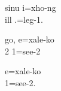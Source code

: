 \ea \label{ex:xhong}
\gll sinu i=xho-ng\\ 
 ill .=leg-1.\\ 
\glt {}
\z


	
%	
%	
%	
%	
%	
%	
%	
%	
%	
\ea \label{ex:alignment}	
\label{ex:fronted_obj}
	\gll go, e=xale-ko \\ 
	 2 1=see-2\\ 
	\glt {}
	\z
	
	\ea\label{ex:non-fronted_obj}
	\gll e=xale-ko \\ 
	 1=see-2.\\ 
	\glt {}
	\z 
	



